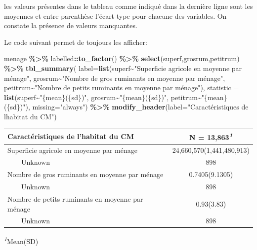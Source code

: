 \documentclass[
]{article}
\newenvironment{Shaded}{\begin{snugshade}}{\end{snugshade}}
\newcommand{\AttributeTok}[1]{\textcolor[rgb]{0.13,0.29,0.53}{#1}}
\newcommand{\FunctionTok}[1]{\textcolor[rgb]{0.13,0.29,0.53}{\textbf{#1}}}
\newcommand{\NormalTok}[1]{#1}
\newcommand{\SpecialCharTok}[1]{\textcolor[rgb]{0.81,0.36,0.00}{\textbf{#1}}}
\newcommand{\StringTok}[1]{\textcolor[rgb]{0.31,0.60,0.02}{#1}}
\begin{document}
les valeurs présentes dans le tableau comme indiqué dans la dernière
ligne sont les moyennes et entre parenthèse l'écart-type pour chacune
des variables. On constate la présence de valeurs manquantes.

Le code suivant permet de toujours les afficher:

\begin{Shaded}
\begin{Highlighting}[]
\NormalTok{menage }\SpecialCharTok{\%\textgreater{}\%}
\NormalTok{  labelled}\SpecialCharTok{::}\FunctionTok{to\_factor}\NormalTok{() }\SpecialCharTok{\%\textgreater{}\%}
  \FunctionTok{select}\NormalTok{(superf,grosrum,petitrum) }\SpecialCharTok{\%\textgreater{}\%}
  \FunctionTok{tbl\_summary}\NormalTok{(}
    \AttributeTok{label=}\FunctionTok{list}\NormalTok{(superf}\SpecialCharTok{\textasciitilde{}}\StringTok{"Superficie agricole en moyenne par ménage"}\NormalTok{,}
\NormalTok{               grosrum}\SpecialCharTok{\textasciitilde{}}\StringTok{"Nombre de gros ruminants en moyenne par ménage"}\NormalTok{,}
\NormalTok{               petitrum}\SpecialCharTok{\textasciitilde{}}\StringTok{"Nombre de petits ruminants en moyenne par ménage"}\NormalTok{),}
    \AttributeTok{statistic =} \FunctionTok{list}\NormalTok{(superf}\SpecialCharTok{\textasciitilde{}}\StringTok{"\{mean\}(\{sd\})"}\NormalTok{,}
\NormalTok{                     grosrum}\SpecialCharTok{\textasciitilde{}}\StringTok{"\{mean\}(\{sd\})"}\NormalTok{,}
\NormalTok{                     petitrum}\SpecialCharTok{\textasciitilde{}}\StringTok{"\{mean\}(\{sd\})"}\NormalTok{),}
    \AttributeTok{missing=}\StringTok{"always"}\NormalTok{) }\SpecialCharTok{\%\textgreater{}\%}
  \FunctionTok{modify\_header}\NormalTok{(}\AttributeTok{label=}\StringTok{"Caractéristiques de l\textquotesingle{}habitat du CM"}\NormalTok{)}
\end{Highlighting}
\end{Shaded}

\begin{table}[!t]
\fontsize{12.0pt}{14.4pt}\selectfont
\begin{tabular*}{\linewidth}{@{\extracolsep{\fill}}lc}
\toprule
Caractéristiques de l'habitat du CM & \textbf{N = 13,863}\textsuperscript{\textit{1}} \\ 
\midrule\addlinespace[2.5pt]
Superficie agricole en moyenne par ménage & 24,660,570(1,441,480,913) \\ 
    Unknown & 898 \\ 
Nombre de gros ruminants en moyenne par ménage & 0.7405(9.1305) \\ 
    Unknown & 898 \\ 
Nombre de petits ruminants en moyenne par ménage & 0.93(3.83) \\ 
    Unknown & 898 \\ 
\bottomrule
\end{tabular*}
\begin{minipage}{\linewidth}
\textsuperscript{\textit{1}}Mean(SD)\\
\end{minipage}
\end{table}
\end{document}
